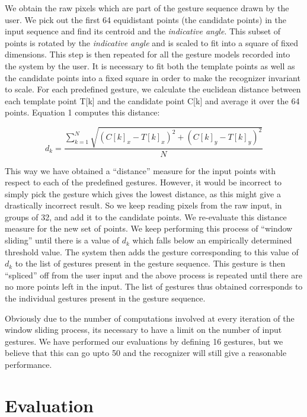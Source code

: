 \documentclass[twoside]{article}
\begin{document}
\begin{multicols}{2}
We obtain the raw pixels which are part of the gesture sequence drawn by the user. We pick out the first 64 equidistant points (the candidate points) in the input sequence and find its centroid and the \textit{indicative angle}. This subset of points is rotated by the \textit{indicative angle} and is scaled to fit into a square of fixed dimensions. This step is then repeated for all the gesture models recorded into the system by the user. It is necessary to fit both the template points as well as the candidate points into a fixed square in order to make the recognizer invariant to scale. For each predefined gesture, we calculate the euclidean distance between each template point T[k] and the candidate point C[k] and average it over the 64 points. Equation 1 computes this distance:

\[
 d_k = \frac{\displaystyle\sum\limits_{k=1}^N \sqrt{(C[k]_x-T[k]_x)^2 + (C[k]_y-T[k]_y)^2}}{N}
\]

This way we have obtained a ``distance'' measure for the input points with respect to each of the predefined gestures. However, it would be incorrect to simply pick the gesture which gives the lowest distance, as this might give a drastically incorrect result. So we keep reading pixels from the raw input, in groups of 32, and add it to the candidate points. We re-evaluate this distance measure for the new set of points. We keep performing this process of ``window sliding'' until there is a value of $d_k$ which falls below an empirically determined threshold value. The system then adds the gesture corresponding to this value of $d_k$ to the list of gestures present in the gesture sequence. This gesture is then ``spliced'' off from the user input and the above process is repeated until there are no more points left in the input. The list of gestures thus obtained corresponds to the individual gestures present in the gesture sequence. %

Obviously due to the number of computations involved at every iteration of the window sliding process, its necessary to have a limit on the number of input gestures. We have performed our evaluations by defining 16 gestures, but we believe that this can go upto 50 and the recognizer will still give a reasonable performance. %


\section{Evaluation}


\end{multicols}
\end{document}
